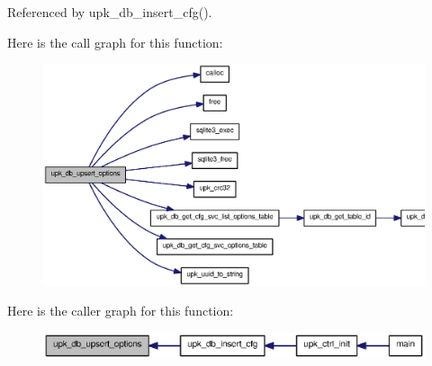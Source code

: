Referenced by upk\_\-db\_\-insert\_\-cfg().



Here is the call graph for this function:
\nopagebreak
\begin{figure}[H]
\begin{center}
\leavevmode
\includegraphics[width=400pt]{group__controller_ga57ebed6498916b4308d1f48be7ff62af_cgraph}
\end{center}
\end{figure}




Here is the caller graph for this function:
\nopagebreak
\begin{figure}[H]
\begin{center}
\leavevmode
\includegraphics[width=400pt]{group__controller_ga57ebed6498916b4308d1f48be7ff62af_icgraph}
\end{center}
\end{figure}


